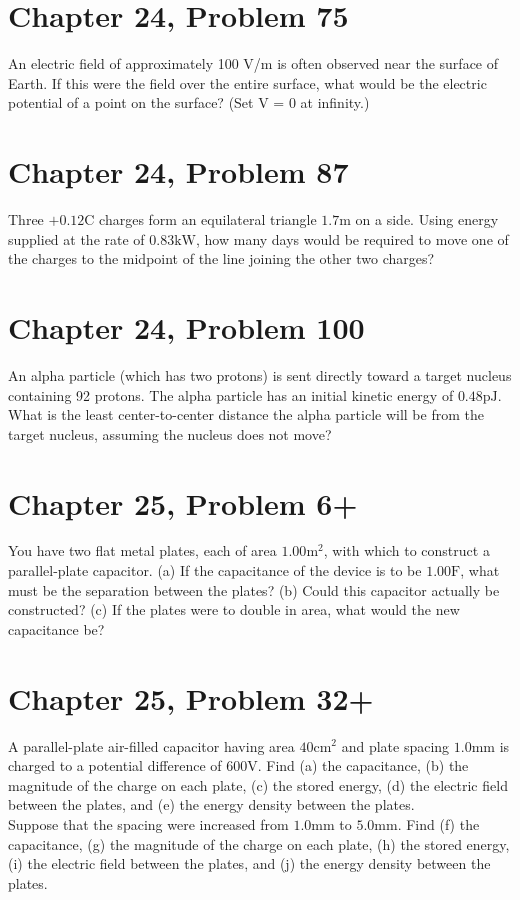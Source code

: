 \documentclass[12pt]{article}
\begin{document}
\section{Chapter 24, Problem 75}
An electric field of approximately 100 V/m is often observed near the surface of Earth. If this were the field over the entire surface, what would be the electric potential of a point on the surface? (Set V = 0 at infinity.)

\section{Chapter 24, Problem 87}
Three $+0.12 \unit{\coulomb}$ charges form an equilateral triangle $1.7 \unit{\meter}$ on a side. Using energy supplied at the rate of $0.83 \unit{\kilo\watt}$, how many days would be required to move one of the charges to the midpoint of the line joining the other two charges?

\section{Chapter 24, Problem 100}
An alpha particle (which has two protons) is sent directly toward a target nucleus containing 92 protons. The alpha particle has an initial kinetic energy of $0.48 \unit{\pico\joule}$. What is the least center-to-center distance the alpha particle will be from the target nucleus, assuming the nucleus does not move?

\section{Chapter 25, Problem 6+}
You have two flat metal plates, each of area $1.00 \unit{\meter^2}$, with which to construct a parallel-plate capacitor. (a) If the capacitance of the device is to be $1.00 \unit{\farad}$, what must be the separation between the plates? (b) Could this capacitor actually be constructed? (c) If the plates were to double in area, what would the new capacitance be?

\section{Chapter 25, Problem 32+}
A parallel-plate air-filled capacitor having area $40 \unit{\centi\meter^2}$ and plate spacing $1.0 \unit{\milli\meter}$ is charged to a potential difference of $600 \unit{\volt}$. Find (a) the capacitance, (b) the magnitude of the charge on each plate, (c) the stored energy, (d) the electric field between the plates, and (e) the energy density between the plates.\\
Suppose that the spacing were increased from $1.0 \unit{\milli\meter}$ to $5.0 \unit{\milli\meter}$. Find (f) the capacitance, (g) the magnitude of the charge on each plate, (h) the stored energy, (i) the electric field between the plates, and (j) the energy density between the plates.
\end{document}
